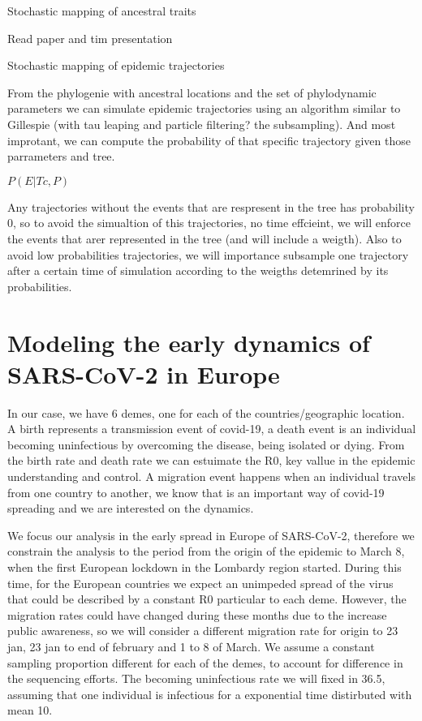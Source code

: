 Stochastic mapping of ancestral traits

Read paper and tim presentation


Stochastic mapping of epidemic trajectories

From the phylogenie with ancestral locations and the set of phylodynamic parameters we can simulate epidemic trajectories using an algorithm similar to Gillespie (with tau leaping and particle filtering? the subsampling). And most improtant, we can compute the probability of that specific trajectory given those parrameters and tree. 

$P(E|Tc, P)$

Any trajectories without the events that are respresent in the tree has probability 0, so to avoid the simualtion of this trajectories, no time effcieint, we will enforce the events that arer represented in the tree (and will include a weigth). Also to avoid low probabilities trajectories, we will importance subsample one trajectory after a certain time of simulation according to the weigths detemrined by its probabilities. 


\section{Modeling the early dynamics of SARS-CoV-2 in Europe}

In our case, we have 6 demes, one for each of the countries/geographic location. A birth represents a transmission event of covid-19, a death event is an individual becoming uninfectious by overcoming the disease, being isolated or dying. From the birth rate and death rate we can estuimate the R0, key vallue in the epidemic understanding and control. A migration event happens when an individual travels from one country to another, we know that is an important way of covid-19 spreading and we are interested on the dynamics. 

We focus our analysis in the early spread in Europe of SARS-CoV-2, therefore we constrain the analysis to the period from the origin of the epidemic to March 8, when the first European lockdown in the Lombardy region started. During this time, for the European countries we expect an unimpeded spread of the virus that could be described by a constant R0 particular to each deme. However, the migration rates could have changed during these months due to the increase public awareness, so we will consider a different migration rate for origin to 23 jan, 23 jan to end of february and 1 to 8 of March. We assume a constant sampling proportion different for each of the demes, to account for difference in the sequencing efforts. The becoming uninfectious rate we will fixed in 36.5, assuming that one individual is infectious for a exponential time distirbuted with mean 10.


